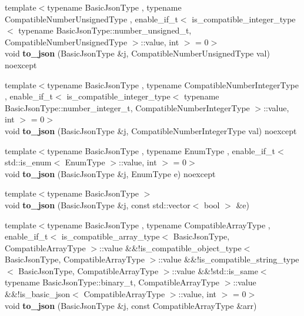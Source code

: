 \begin{DoxyCompactItemize}
{\footnotesize template$<$typename Basic\+Json\+Type , typename Compatible\+Number\+Unsigned\+Type , enable\+\_\+if\+\_\+t$<$ is\+\_\+compatible\+\_\+integer\+\_\+type$<$ typename Basic\+Json\+Type\+::number\+\_\+unsigned\+\_\+t, Compatible\+Number\+Unsigned\+Type $>$\+::value, int $>$  = 0$>$ }\\void {\bfseries to\+\_\+json} (Basic\+Json\+Type \&j, Compatible\+Number\+Unsigned\+Type val) noexcept
\item 
\mbox{\label{namespacenlohmann_1_1detail_a91fe576be579c8c2fdd14610605c6dd2}} 
{\footnotesize template$<$typename Basic\+Json\+Type , typename Compatible\+Number\+Integer\+Type , enable\+\_\+if\+\_\+t$<$ is\+\_\+compatible\+\_\+integer\+\_\+type$<$ typename Basic\+Json\+Type\+::number\+\_\+integer\+\_\+t, Compatible\+Number\+Integer\+Type $>$\+::value, int $>$  = 0$>$ }\\void {\bfseries to\+\_\+json} (Basic\+Json\+Type \&j, Compatible\+Number\+Integer\+Type val) noexcept
\item 
\mbox{\label{namespacenlohmann_1_1detail_a0c8b159dba71981d6c555d284cf6e2bf}} 
{\footnotesize template$<$typename Basic\+Json\+Type , typename Enum\+Type , enable\+\_\+if\+\_\+t$<$ std\+::is\+\_\+enum$<$ Enum\+Type $>$\+::value, int $>$  = 0$>$ }\\void {\bfseries to\+\_\+json} (Basic\+Json\+Type \&j, Enum\+Type e) noexcept
\item 
\mbox{\label{namespacenlohmann_1_1detail_aeca6fb5fede5ed1e12a4420d98a5692b}} 
{\footnotesize template$<$typename Basic\+Json\+Type $>$ }\\void {\bfseries to\+\_\+json} (Basic\+Json\+Type \&j, const std\+::vector$<$ bool $>$ \&e)
\item 
\mbox{\label{namespacenlohmann_1_1detail_a3afebc132c5ff83f9cd160e52030fdfd}} 
{\footnotesize template$<$typename Basic\+Json\+Type , typename Compatible\+Array\+Type , enable\+\_\+if\+\_\+t$<$ is\+\_\+compatible\+\_\+array\+\_\+type$<$ Basic\+Json\+Type, Compatible\+Array\+Type $>$\+::value \&\&!is\+\_\+compatible\+\_\+object\+\_\+type$<$ Basic\+Json\+Type, Compatible\+Array\+Type $>$\+::value \&\&!is\+\_\+compatible\+\_\+string\+\_\+type$<$ Basic\+Json\+Type, Compatible\+Array\+Type $>$\+::value \&\&!std\+::is\+\_\+same$<$ typename Basic\+Json\+Type\+::binary\+\_\+t, Compatible\+Array\+Type $>$\+::value \&\&!is\+\_\+basic\+\_\+json$<$ Compatible\+Array\+Type $>$\+::value, int $>$  = 0$>$ }\\void {\bfseries to\+\_\+json} (Basic\+Json\+Type \&j, const Compatible\+Array\+Type \&arr)

\end{DoxyCompactItemize}
